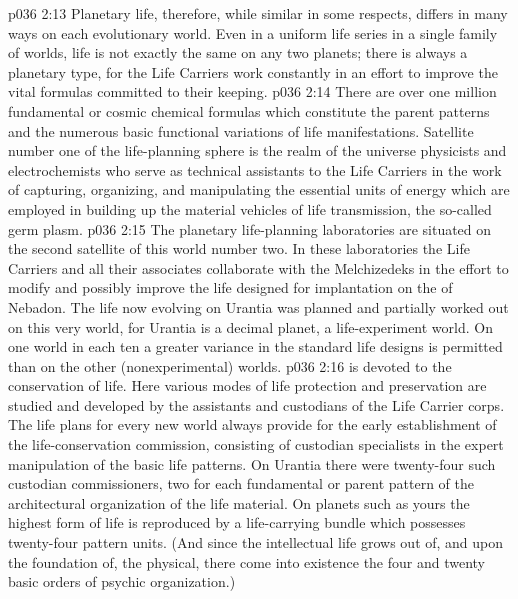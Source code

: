 \vs p036 2:13 Planetary life, therefore, while similar in some respects, differs in many ways on each evolutionary world. Even in a uniform life series in a single family of worlds, life is not exactly the same on any two planets; there is always a planetary type, for the Life Carriers work constantly in an effort to improve the vital formulas committed to their keeping.
\vs p036 2:14 There are over one million fundamental or cosmic chemical formulas which constitute the parent patterns and the numerous basic functional variations of life manifestations. Satellite number one of the life\hyp{}planning sphere is the realm of the universe physicists and electrochemists who serve as technical assistants to the Life Carriers in the work of capturing, organizing, and manipulating the essential units of energy which are employed in building up the material vehicles of life transmission, the so\hyp{}called germ plasm.
\vs p036 2:15 The planetary life\hyp{}planning laboratories are situated on the second satellite of this world number two. In these laboratories the Life Carriers and all their associates collaborate with the Melchizedeks in the effort to modify and possibly improve the life designed for implantation on the  of Nebadon. The life now evolving on Urantia was planned and partially worked out on this very world, for Urantia is a decimal planet, a life\hyp{}experiment world. On one world in each ten a greater variance in the standard life designs is permitted than on the other (nonexperimental) worlds.
\vs p036 2:16 \pc {} is devoted to the conservation of life. Here various modes of life protection and preservation are studied and developed by the assistants and custodians of the Life Carrier corps. The life plans for every new world always provide for the early establishment of the life\hyp{}conservation commission, consisting of custodian specialists in the expert manipulation of the basic life patterns. On Urantia there were twenty\hyp{}four such custodian commissioners, two for each fundamental or parent pattern of the architectural organization of the life material. On planets such as yours the highest form of life is reproduced by a life\hyp{}carrying bundle which possesses twenty\hyp{}four pattern units. (And since the intellectual life grows out of, and upon the foundation of, the physical, there come into existence the four and twenty basic orders of psychic organization.)
